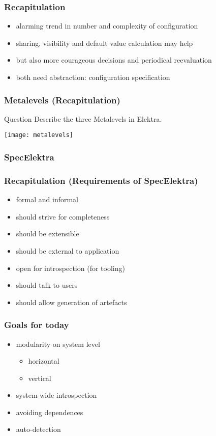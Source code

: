 \begin{frame}[fragile]
	\frametitle{Recapitulation}

	\begin{itemize}[<+-| alert@+>]
	\item alarming trend in number and complexity of configuration
	\item sharing, visibility and default value calculation may help
	\item but also more courageous decisions and periodical reevaluation
	\item both need abstraction: configuration specification
	\end{itemize}
\end{frame}

\begin{frame}
	\frametitle{Metalevels (Recapitulation)}
	\begin{alertblock}{Question}
	Describe the three Metalevels in Elektra.
	\end{alertblock}

	\pause
	\texttt{[image: metalevels]}
\end{frame}

\begin{frame}
	\frametitle{SpecElektra}

	\fontsize{18}{0}\selectfont
\end{frame}

\begin{frame}
	\frametitle{Recapitulation (Requirements of SpecElektra)}

	\pause
	\begin{itemize}
	\item formal and informal
	\item should strive for completeness
	\item should be extensible
	\item should be external to application
	\item open for introspection (for tooling)
	\item should talk to users
	\item should allow generation of artefacts
	\end{itemize}
\end{frame}

\begin{frame}
	\frametitle{Goals for today}
	\begin{itemize}
	\item modularity on system level
	\begin{itemize}
	\item horizontal
	\item vertical
	\end{itemize}
	\item system-wide introspection
	\item avoiding dependences
	\item auto-detection
	\end{itemize}
\end{frame}




